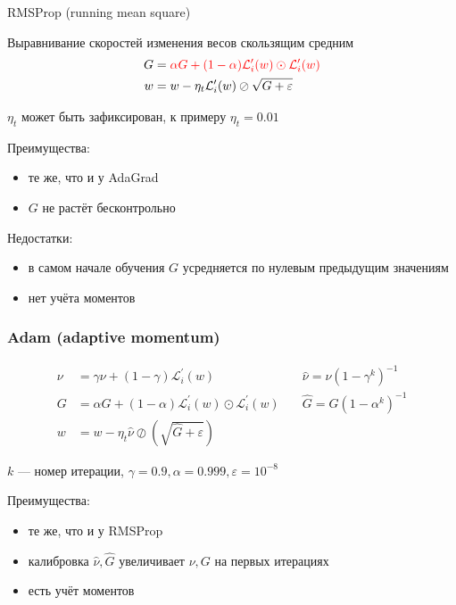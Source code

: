 \documentclass[fullscreen=true, bookmarks=true, hyperref={pdfencoding=unicode}]{beamer}
\begin{document}
\begin{frame}
  {RMSProp (running mean square)}

  Выравнивание скоростей изменения весов скользящим средним
  \begin{align*}
     G &= \color{red}{\alpha} G + \color{red}{(1 - \alpha)}\mathcal{L}_i^\prime(w) \odot \mathcal{L}_i^\prime(w) \\
     w &= w - {\eta_t} {\mathcal{L}_i^\prime(w)}\oslash{\sqrt{G + \varepsilon}}
  \end{align*}

  $\eta_t$ может быть зафиксирован, к примеру $\eta_t = 0.01$

  Преимущества:
  \begin{itemize}
    \item те же, что и у AdaGrad
    \item $G$ не растёт бесконтрольно
  \end{itemize}

 Недостатки:
 \begin{itemize}
   \item в самом начале обучения $G$ усредняется по нулевым предыдущим значениям
   \item нет учёта моментов
 \end{itemize}
\end{frame}


\begin{frame}[t]
  \frametitle{Adam (adaptive momentum)}

  \begin{align*}
  \nu &= \gamma \nu + (1-\gamma) \mathcal{L}_i^\prime(w) \quad     &\hat\nu = \nu(1-\gamma^k)^{-1} \\
    G &= {\alpha} G + {(1 - \alpha)}\mathcal{L}_i^\prime(w) \odot \mathcal{L}_i^\prime(w) \quad &\hat G = G(1-\alpha^k)^{-1} \\
    w &= w - {\eta_t}\hat\nu \oslash (\sqrt{\hat G + \varepsilon})
  \end{align*}

  $k$ — номер итерации, $\gamma = 0.9, \alpha = 0.999, \varepsilon = 10^{-8}$

   Преимущества:
   \begin{itemize}
     \item те же, что и у RMSProp
     \item калибровка $\hat\nu, \hat G$ увеличивает $\nu, G$ на первых итерациях
     \item есть учёт моментов
   \end{itemize}
\end{frame}
\end{document}
